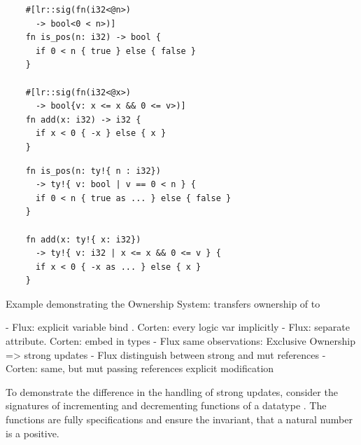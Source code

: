 \documentclass[twoside, english]{sdqthesis}
\theoremstyle{definition}
\begin{document}
\begin{listing}[ht]
  \begin{minipage}[t]{0.48\linewidth}
    
    \begin{verbatim}
    #[lr::sig(fn(i32<@n>) 
      -> bool<0 < n>)]
    fn is_pos(n: i32) -> bool {
      if 0 < n { true } else { false }
    }

    #[lr::sig(fn(i32<@x>) 
      -> bool{v: x <= x && 0 <= v>)]
    fn add(x: i32) -> i32 {
      if x < 0 { -x } else { x }
    }
    \end{verbatim}
  \end{minipage}
  \begin{minipage}[t]{0.48\linewidth}
    \begin{verbatim}
    fn is_pos(n: ty!{ n : i32}) 
      -> ty!{ v: bool | v == 0 < n } {
      if 0 < n { true as ... } else { false }
    }

    fn add(x: ty!{ x: i32}) 
      -> ty!{ v: i32 | x <= x && 0 <= v } {
      if x < 0 { -x as ... } else { x }
    }
    \end{verbatim}
  \end{minipage}
  
  \caption{Example demonstrating the Ownership System:  transfers ownership of  to }
  \label{lst:compare-flux-fundamentals}
\end{listing}

- Flux: explicit variable bind . Corten: every logic var implicitly
- Flux: separate attribute. Corten: embed in types
- Flux same observations: Exclusive Ownership => strong updates
- Flux distinguish between strong and mut references
  - Corten: same, but mut passing references explicit modification


To demonstrate the difference in the handling of strong updates, consider the signatures of incrementing and decrementing functions of a datatype . The functions are fully specifications and ensure the invariant, that a natural number is a positive.
\end{document}
